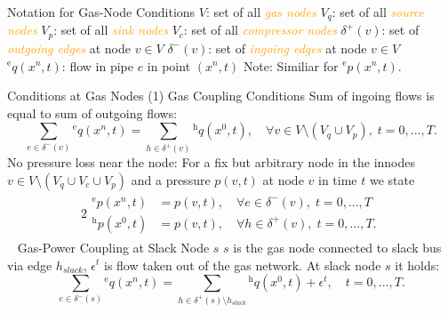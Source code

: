 \documentclass[8pt]{beamer}
\newcommand\Fontli{\fontsize{7}{7.2}\selectfont}
\begin{document}
\begin{frame}{Notation for Gas-Node Conditions}
$V$: set of all \textcolor{orange}{\textit{gas nodes}}\newline
$V_q$: set of all \textcolor{orange}{\textit{source nodes}} \newline
$V_p$: set of all \textcolor{orange}{\textit{sink nodes}} \newline
$V_c$: set of all \textcolor{orange}{\textit{compressor nodes}} \newline \newline
$\delta^+(v)$: set of \textcolor{orange}{\textit{outgoing edges}} at node $v \in V$ \newline
$\delta^-(v)$: set of \textcolor{orange}{\textit{ingoing edges}} at node $v \in V$ \newline\newline
${}^\text{e}q(x^n,t)$: flow in pipe $e$ in point $(x^n,t)$\newline
\textcolor{bluepurp}{Note:} Similiar for ${}^\text{e}p(x^n,t)$.
\end{frame}

\begin{frame}{Conditions at Gas Nodes (1)}
\Fontli
\textcolor{bluepurp}{Gas Coupling Conditions} \newline\newline
Sum of ingoing flows is equal to sum of outgoing flows:
\begin{equation}
\sum_{e \in \delta^-(v)}  {}^\text{e}q(x^n,t) = \sum_{h \in \delta^+(v)} {}^\text{h}q(x^0,t),  \quad  \forall v \in V \setminus (V_q \cup V_p), \; t = 0,...,T.
\end{equation}
No pressure loss near the node: \newline
For a fix but arbitrary node in the innodes $v \in V\setminus (V_q \cup V_c  \cup V_p)$ and a pressure $p(v,t)$ at node $v$ in time $t$ we state
\begin{alignat}{2}
\begin{split}
{}^\text{e}p(x^n,t) &= p(v,t), \quad \forall e \in \delta^-(v),  \;  t = 0,...,T\\
{}^\text{h}p(x^0,t) &= p(v,t), \quad \forall h \in \delta^+(v), \;  t = 0,...,T.
\end{split}
\label{Eq:5.16}
\end{alignat}
\ \newline\newline
\textcolor{bluepurp}{Gas-Power Coupling at Slack Node $s$}\newline\newline
$s$ is the gas node connected to slack bus via edge $h_{slack}$,  $\epsilon^t$ is flow taken out of the gas network.  At slack node $s$ it holds:
\begin{equation}
\sum_{e \in \delta^-(s)} {}^\text{e}q(x^n,t) = \sum_{h \in \delta^+(s)\setminus {h_{slack}}}  {}^\text{h} q(x^0,t)  + \epsilon^t, \quad t = 0,...,T.
\end{equation}
\end{frame}
\end{document}
